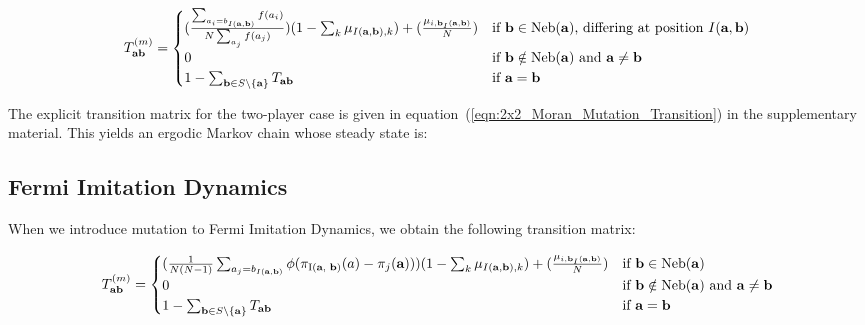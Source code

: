 \documentclass{article}
\begin{document}
\begin{large}
    \begin{equation}
        T^{(m)}_\textbf{ab} = 
        \begin{cases}
            (\frac{\sum_{a_i = b_{I(\textbf{a}, \textbf{b})}}{f(a_i)}}{N\sum_{a_j}f(a_j)})(1-\sum_{k}\mu_{I(\textbf{a}, \textbf{b}),k}) + (\frac{\mu_{i,\textbf{b}_I(\textbf{a}, \textbf{b})}}{N}) & \text{if }\textbf{b} \in \text{Neb(\textbf{a})}\text{, differing at position }I(\textbf{a}, \textbf{b})\\
            0 & \text{if }\textbf{b} \notin \text{Neb(\textbf{a}) and \textbf{a}}\neq \textbf{b}\\
            1 - \sum_{\textbf{b} \in S \setminus \text{\{\textbf{a}\}}}T_{\textbf{ab}} & \text{if }\textbf{a}=\textbf{b}
        \end{cases}
    \label{eqn:Moran_Probability_Function_mutation}
    \end{equation}
\end{large}

The explicit transition matrix for the two-player case is given in
equation~(\ref{eqn:2x2_Moran_Mutation_Transition}) in the supplementary
material. This yields an ergodic Markov chain whose steady state is:


\subsection{Fermi Imitation Dynamics}
When we introduce mutation to Fermi Imitation Dynamics, we obtain the following
transition matrix:

\begin{large}
    \begin{equation}
        T^{(m)}_\textbf{ab}  = 
        \begin{cases}
            (\frac{1}{N(N-1)}\sum_{a_j=b_{I(\textbf{a}, \textbf{b})}}\phi(\pi_{\text{I(\textbf{a}, \textbf{b})}}(a) - \pi_{j}(\textbf{a})))(1-\sum_{k}\mu_{I(\textbf{a}, \textbf{b}),k}) + (\frac{\mu_{i,\textbf{b}_I(\textbf{a}, \textbf{b})}}{N}) & \text{if }\textbf{b} \in \text{Neb(\textbf{a})}\\
            0 & \text{if }\textbf{b} \notin \text{Neb(\textbf{a}) and \textbf{a}}\neq \textbf{b}\\
            1 - \sum_{\textbf{b} \in S \setminus \text{\{\textbf{a}\}}}T_{\textbf{ab}} & \text{if }\textbf{a}=\textbf{b}
        \end{cases}
    \label{eqn:imitation_prob_mutation}
    \end{equation}
\end{large}
\end{document}
